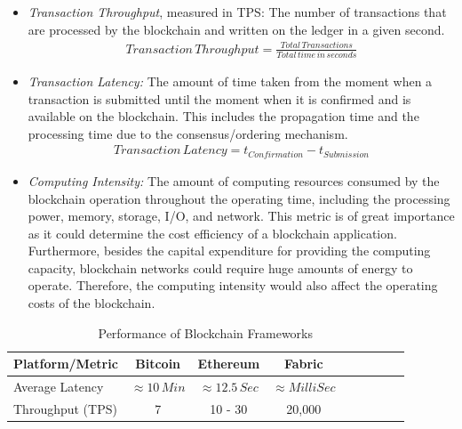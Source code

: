 \begin{itemize}
    \item \textit{Transaction Throughput}, measured in \ac{TPS}:
    The number of transactions that are processed by the blockchain and written on the ledger in a given second.
    \vspace{-1mm}
    \begin{equation}
    \begin{split}
    Transaction\,Throughput = \frac{Total\,Transactions}{Total\,time\,in\,seconds}
    \end{split}
    \label{eq1}
    \end{equation}

    \item \textit{Transaction Latency:}
    The amount of time taken from the moment when a transaction is submitted until the moment when it is confirmed and is available on the blockchain. This includes the propagation time and the processing time due to the consensus/ordering mechanism.
    \vspace{-3mm}
    \begin{equation} \label{eq2}
    \begin{split}
    Transaction\,Latency = t_{Confirmation} - t_{Submission}
    \end{split}
    \end{equation}


    \item \textit{Computing Intensity:}
    The amount of computing resources consumed by the blockchain operation throughout the operating time, including the processing power, memory, storage, I/O, and network. This metric is of great importance as it could determine the cost efficiency of a blockchain application. Furthermore, besides the capital expenditure for providing the computing capacity, blockchain networks could require huge amounts of energy to operate. Therefore, the computing intensity would also affect the operating costs of the blockchain.
    

\end{itemize}


\begin{table}%
  \caption{Performance of Blockchain Frameworks} 
  \label{tab:bc-perform}
  \small %
  \centering %
  \begin{tabular}{lcccccccr} %
  \toprule[\heavyrulewidth]\toprule[\heavyrulewidth]
  Platform/Metric & Bitcoin    & Ethereum     &  Fabric \\ \hline
  \midrule
    Average Latency  & $\approx 10\, Min$ & $\approx 12.5\, Sec$ & $\approx MilliSec$      \\
    Throughput (TPS) & 7   & 10 - 30    & 20,000 \cite{Gorenflo_2019}          \\
  \bottomrule[\heavyrulewidth] 
  \end{tabular}
\end{table}



